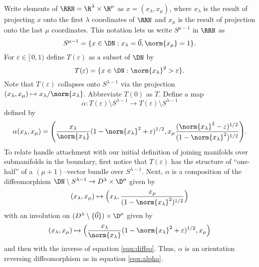 Write elements of $\RRN=\R^\lambda\times\R^\mu$ as $x=(x_\lambda,x_\mu)$, where $x_\lambda$ is the result of projecting $x$ onto the first $\lambda$ coordinates of $\RRN$ and $x_\mu$ is the result of projection onto the last $\mu$ coordinates.
This notation lets us write $S^{\mu-1}$ in $\RRN$ as
\[
	S^{\mu-1} = \{x\in \DN: x_\lambda=\vec{0},\norm{x_\mu}=1\}.
\]
For $\varepsilon\in [\,0,1)$ define $T(\varepsilon)$ as a subset of $\DN$ by
\[
	T(\varepsilon) = \{x\in \DN: \norm{x_\lambda}^2>\varepsilon\}.
\]
Note that $T(\varepsilon)$ collapses onto $S^{\lambda-1}$ via the projection $(x_\lambda,x_\mu)\mapsto x_\lambda/\norm{x_\lambda}$.
Abbreviate $T(0)$ as $T$.
Define a map
\[
	\alpha:T(\varepsilon)\setminus S^{\lambda-1} \to T(\varepsilon)\setminus S^{\lambda-1}
\]
defined by
\begin{equation}
	\alpha(x_\lambda, x_\mu) =
	\Bigg( 
		\frac{x_\lambda}{\norm{x_\lambda}}
		(1-\norm{x_\lambda}^2+\varepsilon)^{1/2},
		x_\mu
		\frac{
			(\norm{x_\lambda}^2-\varepsilon)^{1/2}
		}{
			(1-\norm{x_\lambda}^2)^{1/2}
		}
	\Bigg).
\end{equation}
To relate handle attachment with our initial definition of joining manifolds over submanifolds in the boundary, first notice that $T(\varepsilon)$ has the structure of ``one-half'' of a $(\mu+1)$--vector bundle over $S^{\lambda-1}$.
Next, $\alpha$ is a composition of the diffeomorphism $\DN\setminus S^{\lambda-1}\to D^\lambda\times \D^\mu$ given by
\begin{equation}
	\label{eqn:diffeo}
	(x_\lambda,x_\mu)\mapsto \Big(x_\lambda,\frac{x_\mu}{(1-\norm{x_\lambda}^2)^{1/2}}\Big)
\end{equation}
with an involution on $(D^\lambda\setminus\{\vec{0}\})\times \D^\mu$ given by
\begin{equation}
	(x_\lambda,x_\mu)\mapsto \Big(\frac{x_\lambda}{\norm{x_\lambda}}(1-\norm{x_\lambda}^2+\varepsilon)^{1/2},x_\mu \Big)
\end{equation}
and then with the inverse of equation \ref{eqn:diffeo}.
Thus, $\alpha$ is an orientation reversing diffeomorphism as in equation \ref{eqn:alpha}.
